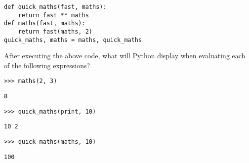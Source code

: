 \begin{blocksection}
\question

\begin{lstlisting}
def quick_maths(fast, maths): 
    return fast ** maths
def maths(fast, maths):
    return fast(maths, 2)
quick_maths, maths = maths, quick_maths
\end{lstlisting}

After executing the above code, what will Python
display when evaluating each of the following expressions?

\begin{lstlisting}
>>> maths(2, 3)
\end{lstlisting}
\begin{solution}[0.5in]
\begin{lstlisting}
8
\end{lstlisting}
\end{solution}

\begin{lstlisting}
>>> quick_maths(print, 10)
\end{lstlisting}
\begin{solution}[0.5in]
\begin{lstlisting}
10 2
\end{lstlisting}
\end{solution}

\begin{lstlisting}
>>> quick_maths(maths, 10)
\end{lstlisting}
\begin{solution}[0.5in]
\begin{lstlisting}
100
\end{lstlisting}
\end{solution}
\end{blocksection}
